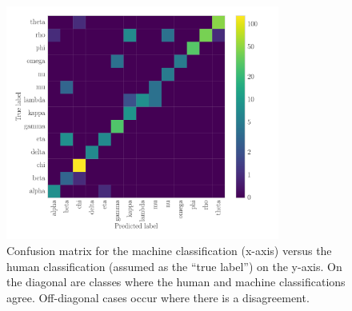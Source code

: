 \documentclass[12pt]{emulateapj}
\begin{document}
\begin{figure}[htbp]
\begin{center}
\includegraphics[width=9cm]{grs1915_supervised_cm.pdf}
\caption{Confusion matrix for the machine classification (x-axis) versus the human classification (assumed as the ``true label'') on the 
y-axis. On the diagonal are classes where the human and machine classifications agree. Off-diagonal cases occur where there is a 
disagreement.} 
\label{fig:confusion_matrix}
\end{center}
\end{figure}
\end{document}
